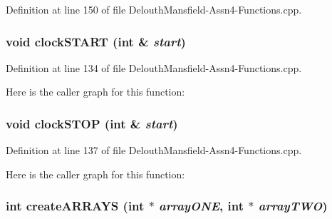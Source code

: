 Definition at line 150 of file DelouthMansfield-\/Assn4-\/Functions.cpp.

\hypertarget{_delouth_mansfield-_assn4-_functions_8cpp_a6b17282d3fa11bfcbc1d8098878dbb24}{
\subsubsection[{clockSTART}]{\setlength{\rightskip}{0pt plus 5cm}void clockSTART (int \& {\em start})}}
\label{_delouth_mansfield-_assn4-_functions_8cpp_a6b17282d3fa11bfcbc1d8098878dbb24}


Definition at line 134 of file DelouthMansfield-\/Assn4-\/Functions.cpp.



Here is the caller graph for this function:

\hypertarget{_delouth_mansfield-_assn4-_functions_8cpp_afeefecdec1b2e0e10953da91eba90ef3}{
\subsubsection[{clockSTOP}]{\setlength{\rightskip}{0pt plus 5cm}void clockSTOP (int \& {\em start})}}
\label{_delouth_mansfield-_assn4-_functions_8cpp_afeefecdec1b2e0e10953da91eba90ef3}


Definition at line 137 of file DelouthMansfield-\/Assn4-\/Functions.cpp.



Here is the caller graph for this function:

\hypertarget{_delouth_mansfield-_assn4-_functions_8cpp_af6def39a6d22c624eb8874f368ea429e}{
\subsubsection[{createARRAYS}]{\setlength{\rightskip}{0pt plus 5cm}int createARRAYS (int $\ast$ {\em arrayONE}, \/  int $\ast$ {\em arrayTWO})}}
\label{_delouth_mansfield-_assn4-_functions_8cpp_af6def39a6d22c624eb8874f368ea429e}


